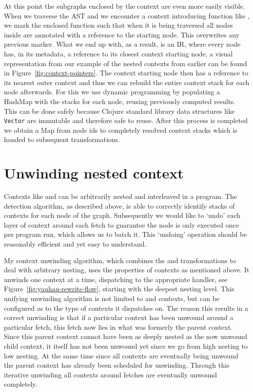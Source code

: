 At this point the subgraphs enclosed by the context are even more easily visible.
When we traverse the AST and we encounter a context introducing function like \smap{}, we mark the enclosed function such that when it is being traversed all nodes inside are annotated with a reference to the \smap{} starting node.
This overwrites any previous marker.
What we end up with, as a result, is an IR, where every node has, in its metadata, a reference to its closest context starting node, a visual representation from our example of the nested contexts from earlier can be found in Figure~\ref{fig:context-pointers}.
The context starting node then has a reference to its nearest outer context and thus we can rebuild the entire context stack for each node afterwards.
For this we use dynamic programming by populating a HashMap with the stacks for each node, reusing previously computed results.
This can be done safely because Clojure standard library data structures like \texttt{Vector} are immutable and therefore safe to reuse.
After this process is completed we obtain a Map from node ids to completely resolved context stacks which is handed to subsequent transformations.

\section{Unwinding nested context}

Contexts like \ifop{} and \smap{} can be arbitrarily nested and interleaved in a program.
The detection algorithm, as described above, is able to correctly identify stacks of contexts for each node of the graph.
Subsequently we would like to `undo' each layer of context around each fetch to guarantee the node is only executed once per program run, which allows us to batch it.
This `undoing' operation should be reasonably efficient and yet easy to understand.

My context unwinding algorithm, which combines the \ifop{} and \smap{} transformations to deal with arbitrary nesting, uses the properties of contexts as mentioned above.
It unwinds one context at a time, dispatching to the appropriate handler, see Figure~\ref{fig:yauhau-rewrite-flow}, starting with the deepest nesting level.
This unifying unwinding algorithm is not limited to \ifop{} and \smap{} contexts, but can be configured as to the type of contexts it dispatches on.
The reason this results in a correct unwinding is that if a particular context has been unwound around a particular fetch, this fetch now lies in what was formerly the parent context.
Since this parent context cannot have been as deeply nested as the now unwound child context, it itself has not been unwound yet since we go from high nesting to low nesting.
At the same time since all contexts are eventually being unwound the parent context has already been scheduled for unwinding.
Through this iterative unwinding all contexts around fetches are eventually unwound completely.


